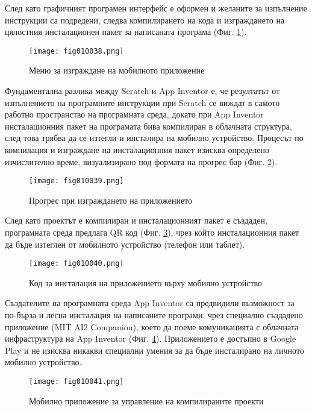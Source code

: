 След като графичният програмен интерфейс е оформен и желаните за изпълнение инструкции са подредени, следва компилирането на кода и изграждането на цялостния инсталационен пакет за написаната програма (Фиг. \ref{fig010038}). 

\begin{figure}[H]
  \centering
  \texttt{[image: fig010038.png]}
  \caption{Меню за изграждане на мобилното приложение}
\label{fig010038}
\end{figure}

Фундаментална разлика между Scratch и App Inventor е, че резултатът от изпълнението на програмните инструкции при Scratch се виждат в самото работно пространство на програмната среда, докато при App Inventor инсталационния пакет на програмата бива компилиран в облачната структура, след това трябва да се изтегли и инсталира на мобилно устройство. Процесът по компилация и изграждане на инсталационния пакет изисква определено изчислително време, визуализирано под формата на прогрес бар (Фиг. \ref{fig010039}).

\begin{figure}[H]
  \centering
  \texttt{[image: fig010039.png]}
  \caption{Прогрес при изграждането на приложението}
\label{fig010039}
\end{figure}

След като проектът е компилиран и инсталационният пакет е създаден, програмната среда предлага QR код (Фиг. \ref{fig010040}), чрез който инсталационния пакет да бъде изтеглен от мобилното устройство (телефон или таблет).

\begin{figure}[H]
  \centering
  \texttt{[image: fig010040.png]}
  \caption{Код за инсталация на приложението върху мобилно устройство}
\label{fig010040}
\end{figure}

Създателите на програмната среда App Inventor са предвидили възможност за по-бърза и лесна инсталация на написаните програми, чрез специално създадено приложение (MIT AI2 Companion), което да поеме комуникацията с облачната инфраструктура на App Inventor (Фиг. \ref{fig010041}). Приложението е достъпно в Google Play и не изисква никакви специални умения за да бъде инсталирано на личното мобилно устройство. 

\begin{figure}[H]
  \centering
  \texttt{[image: fig010041.png]}
  \caption{Мобилно приложение за управление на компилираните проекти}
\label{fig010041}
\end{figure}

